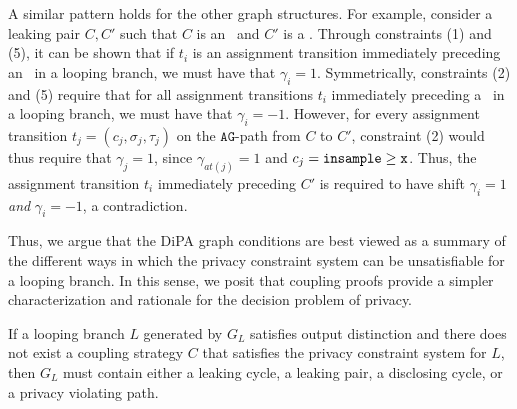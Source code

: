 A similar pattern holds for the other graph structures. For example, consider a leaking pair $C, C'$ such that $C$ is an \lcycle~and $C'$ is a \gcycle. 
Through constraints (1) and (5), it can be shown that if $t_i$ is an assignment transition immediately preceding an \lcycle~in a looping branch, we must have that $\gamma_i = 1$. Symmetrically, constraints (2) and (5) require that for all assignment transitions $t_i$ immediately preceding a \gcycle~in a looping branch, we must have that $\gamma_i =-1$. 
However, for every assignment transition $t_j = (c_j, \sigma_j, \tau_j)$ on the $\texttt{AG}$-path from $C$ to $C'$, constraint (2) would thus require that $\gamma_j = 1$, since $\gamma_{at(j)} = 1$ and $c_j =\gguard[\texttt{x}]$. Thus, the assignment transition $t_i$ immediately preceding $C'$ is required to have shift $\gamma_i = 1$ \textit{and} $\gamma_i = -1$, a contradiction.



Thus, we argue that the DiPA graph conditions are best viewed as a summary of the different ways in which the privacy constraint system can be unsatisfiable for a looping branch. In this sense, we posit that coupling proofs provide a simpler characterization and rationale for the decision problem of privacy. 


\begin{lemma}
    If a looping branch $L$ generated by $G_L$ satisfies output distinction and there does not exist a coupling strategy $C$ that satisfies the privacy constraint system for $L$, then $G_L$ must contain either a leaking cycle, a leaking pair, a disclosing cycle, or a privacy violating path. 
\end{lemma}